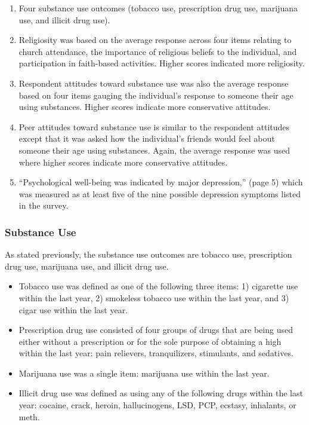 \documentclass[]{article}
\providecommand{\tightlist}{%
  \setlength{\itemsep}{0pt}\setlength{\parskip}{0pt}}
\begin{document}
\begin{enumerate}
\def\labelenumi{\arabic{enumi}.}
\tightlist
\item
  Four substance use outcomes (tobacco use, prescription drug use,
  marijuana use, and illicit drug use).
\item
  Religiosity was based on the average response across four items
  relating to church attendance, the importance of religious beliefs to
  the individual, and participation in faith-based activities. Higher
  scores indicated more religiosity.
\item
  Respondent attitudes toward substance use was also the average
  response based on four items gauging the individual's response to
  someone their age using substances. Higher scores indicate more
  conservative attitudes.
\item
  Peer attitudes toward substance use is similar to the respondent
  attitudes except that it was asked how the individual's friends would
  feel about someone their age using substances. Again, the average
  response was used where higher scores indicate more conservative
  attitudes.
\item
  ``Psychological well-being was indicated by major depression,'' (page
  5) which was measured as at least five of the nine possible depression
  symptoms listed in the survey.
\end{enumerate}

\subsubsection{Substance Use}\label{substance-use}

As stated previously, the substance use outcomes are tobacco use,
prescription drug use, marijuana use, and illicit drug use.

\begin{itemize}
\tightlist
\item
  Tobacco use was defined as one of the following three items: 1)
  cigarette use within the last year, 2) smokeless tobacco use within
  the last year, and 3) cigar use within the last year.
\item
  Prescription drug use consisted of four groups of drugs that are being
  used either without a prescription or for the sole purpose of
  obtaining a high within the last year: pain relievers, tranquilizers,
  stimulants, and sedatives.
\item
  Marijuana use was a single item: marijuana use within the last year.
\item
  Illicit drug use was defined as using any of the following drugs
  within the last year: cocaine, crack, heroin, hallucinogens, LSD, PCP,
  ecstasy, inhalants, or meth.
\end{itemize}
\end{document}
